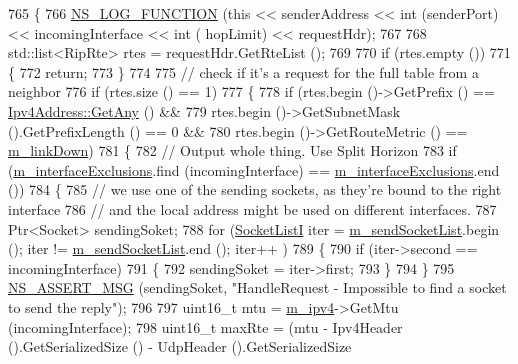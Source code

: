 \begin{DoxyCode}
765 \{
766   \hyperlink{log-macros-disabled_8h_a90b90d5bad1f39cb1b64923ea94c0761}{NS\_LOG\_FUNCTION} (\textcolor{keyword}{this} << senderAddress << \textcolor{keywordtype}{int} (senderPort) << incomingInterface << \textcolor{keywordtype}{int} (
      hopLimit) << requestHdr);
767 
768   std::list<RipRte> rtes = requestHdr.GetRteList ();
769 
770   \textcolor{keywordflow}{if} (rtes.empty ())
771     \{
772       \textcolor{keywordflow}{return};
773     \}
774 
775   \textcolor{comment}{// check if it's a request for the full table from a neighbor}
776   \textcolor{keywordflow}{if} (rtes.size () == 1)
777     \{
778       \textcolor{keywordflow}{if} (rtes.begin ()->GetPrefix () == \hyperlink{classns3_1_1Ipv4Address_a7a39b330c8e701183a411d5779fca1a4}{Ipv4Address::GetAny} () &&
779           rtes.begin ()->GetSubnetMask ().GetPrefixLength () == 0 &&
780           rtes.begin ()->GetRouteMetric () == \hyperlink{classns3_1_1Rip_a3f37d4c5176e380482edf0be82d2fc18}{m\_linkDown})
781         \{
782           \textcolor{comment}{// Output whole thing. Use Split Horizon}
783           \textcolor{keywordflow}{if} (\hyperlink{classns3_1_1Rip_a30e2c00645f24a3b29be981f5d592773}{m\_interfaceExclusions}.find (incomingInterface) == 
      \hyperlink{classns3_1_1Rip_a30e2c00645f24a3b29be981f5d592773}{m\_interfaceExclusions}.end ())
784             \{
785               \textcolor{comment}{// we use one of the sending sockets, as they're bound to the right interface}
786               \textcolor{comment}{// and the local address might be used on different interfaces.}
787               Ptr<Socket> sendingSoket;
788               \textcolor{keywordflow}{for} (\hyperlink{classns3_1_1Rip_a0395b3977eeeb90190ccfa5758a3957f}{SocketListI} iter = \hyperlink{classns3_1_1Rip_a58b5f6ebcee2ed04249fd025abfa61cb}{m\_sendSocketList}.begin (); iter != 
      \hyperlink{classns3_1_1Rip_a58b5f6ebcee2ed04249fd025abfa61cb}{m\_sendSocketList}.end (); iter++ )
789                 \{
790                   \textcolor{keywordflow}{if} (iter->second == incomingInterface)
791                     \{
792                       sendingSoket = iter->first;
793                     \}
794                 \}
795               \hyperlink{assert_8h_aff5ece9066c74e681e74999856f08539}{NS\_ASSERT\_MSG} (sendingSoket, \textcolor{stringliteral}{"HandleRequest - Impossible to find a socket to
       send the reply"});
796 
797               uint16\_t mtu = \hyperlink{classns3_1_1Rip_a6e2c0e74d2fa8643d223db26621dd7f1}{m\_ipv4}->GetMtu (incomingInterface);
798               uint16\_t maxRte = (mtu - Ipv4Header ().GetSerializedSize () - UdpHeader ().GetSerializedSize 

\end{DoxyCode}
